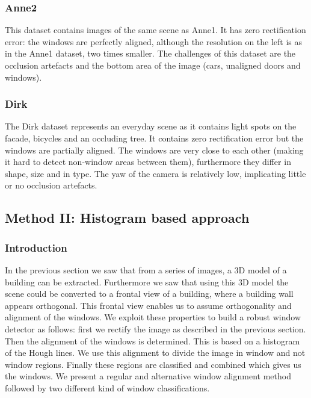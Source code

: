 \subsubsection{Anne2}
This dataset contains images of the same scene as Anne1.
It has zero rectification error: the windows are perfectly aligned, although the
resolution on the left is as in the Anne1 dataset, two times smaller.
The challenges of this dataset are the occlusion artefacts and the 
bottom area of the image (cars, unaligned doors and windows).
\clearpage

\subsubsection{Dirk}
The Dirk dataset represents an everyday scene as it contains light spots on the facade,
bicycles and an occluding tree.  It contains zero rectification error but the
windows are partially aligned.  The windows are very close to each other (making it
hard to detect non-window areas between them), furthermore they differ in shape, size
and in type.  The yaw of the camera is relatively low, implicating little or no
occlusion artefacts.
\clearpage




\subsection{Method II: Histogram based approach} 
\label{sec:method2}
\subsubsection{Introduction}
In the previous section we saw that from a series of images, a 3D model of a
building can be extracted. Furthermore we saw that using this 3D model the
scene could be converted to a frontal view of a building, where a building wall
appears orthogonal.  This frontal view enables us to assume orthogonality and
alignment of the windows.  We exploit these properties to build a robust window
detector as follows: first we rectify the image as described in the previous section.  Then the alignment of the windows
is determined. This is based on a histogram of the Hough lines. We use this
alignment to divide the image in window and not window regions.  Finally these
regions are classified and combined which gives us the windows.
We present a regular and alternative window alignment method
followed by two different kind of window classifications. 


